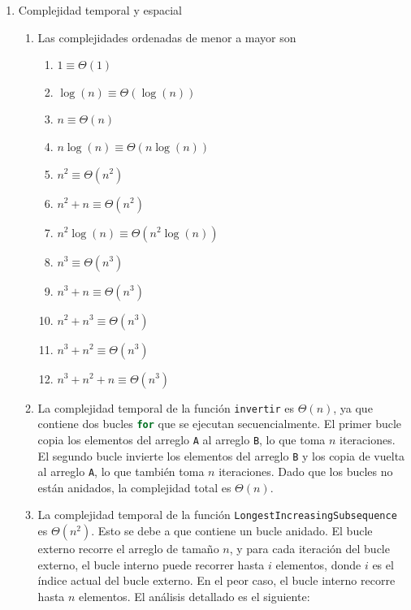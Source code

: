 \documentclass[12pt]{article}
\begin{document}
\begin{enumerate}
            \item Complejidad temporal y espacial
            \begin{enumerate}[label*=\arabic*.]
                \item Las complejidades ordenadas de menor a mayor son
                \begin{multicols}{3}
                    \begin{enumerate}[leftmargin=-1em]
                        \item $1 \equiv \Theta(1)$
                        \item $\log(n) \equiv \Theta(\log(n))$
                        \item $n \equiv \Theta(n)$
                        \item $n\log(n)  \equiv \Theta(n\log(n))$
                        \item $n^{2} \equiv \Theta(n^{2})$
                        \item $n^{2} + n \equiv \Theta(n^{2})$
                        \item $n^2 \log(n)  \equiv \Theta(n^{2}\log(n))$
                        \item $n^{3} \equiv \Theta(n^{3})$
                        \item $n^{3} + n \equiv \Theta(n^{3})$
                        \item $n^{2} + n^{3} \equiv \Theta(n^{3})$
                        \item $n^{3} + n^{2} \equiv \Theta(n^{3})$
                        \item $n^{3} + n^{2} + n \equiv \Theta(n^{3})$
                    \end{enumerate}
                \end{multicols}

                \item La complejidad temporal de la función \lstinline[language=C]|invertir| es $\Theta(n)$, ya que contiene dos bucles \lstinline[language=C]|for| que se ejecutan secuencialmente. El primer bucle copia los elementos del arreglo \lstinline[language=C]|A| al arreglo \lstinline[language=C]|B|, lo que toma $n$ iteraciones. El segundo bucle invierte los elementos del arreglo \lstinline[language=C]|B| y los copia de vuelta al arreglo \lstinline[language=C]|A|, lo que también toma $n$ iteraciones. Dado que los bucles no están anidados, la complejidad total es $\Theta(n)$.

                \item La complejidad temporal de la función \lstinline[language=C]|LongestIncreasingSubsequence| es $\Theta(n^2)$. Esto se debe a que contiene un bucle anidado. El bucle externo recorre el arreglo de tamaño $n$, y para cada iteración del bucle externo, el bucle interno puede recorrer hasta $i$ elementos, donde $i$ es el índice actual del bucle externo. En el peor caso, el bucle interno recorre hasta $n$ elementos. El análisis detallado es el siguiente:


\end{enumerate}
\end{enumerate}
\end{document}
